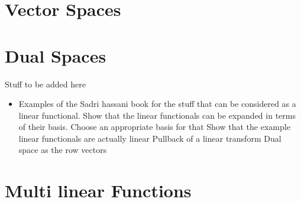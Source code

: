 \section{Vector Spaces}

\section{Dual Spaces}



Stuff to be added here

\begin{itemize}
	\item Examples of the Sadri hassani book for the stuff that can be considered as a linear functional. 
	\subitem Show that the linear functionals can be expanded in terms of their basis. Choose an appropriate basis for that
	\subitem Show that the example linear functionals are actually linear 
	\subitem Pullback of a linear transform
	\subitem Dual space as the row vectors
\end{itemize}


\section{Multi linear Functions}